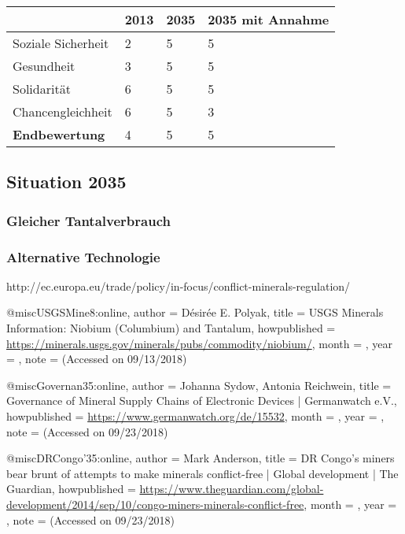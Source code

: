
\begin{table}[]
    \begin{tabular}{l|lll} & \textbf{2013} & \textbf{2035} &  \textbf{2035 mit Annahme} 
        \\ \hline Soziale Sicherheit    & 2  & 5  & 5
        \\ Gesundheit                   & 3  & 5  & 5
        \\ Solidarität                  & 6  & 5  & 5
        \\ Chancengleichheit            & 6  & 5  & 3
        \\ \hline \textbf{Endbewertung} & 4  & 5  & 5
    \end{tabular}
\end{table}




\subsection{Situation 2035}

\subsubsection{Gleicher Tantalverbrauch}

\subsubsection{Alternative Technologie}

http://ec.europa.eu/trade/policy/in-focus/conflict-minerals-regulation/

@misc{USGSMine8:online,
author = {Désirée E. Polyak},
title = {USGS Minerals
Information: Niobium (Columbium) and Tantalum},
howpublished = {\url{https://minerals.usgs.gov/minerals/pubs/commodity/niobium/}},
month = {},
year = {},
note = {(Accessed on 09/13/2018)}
}

@misc{Governan35:online,
author = {Johanna Sydow, Antonia Reichwein},
title = {Governance of Mineral Supply Chains of Electronic Devices | Germanwatch e.V.},
howpublished = {\url{https://www.germanwatch.org/de/15532}},
month = {},
year = {},
note = {(Accessed on 09/23/2018)}
}

@misc{DRCongo’35:online,
author = {Mark Anderson},
title = {DR Congo’s miners bear brunt of attempts to make minerals conflict-free | Global development | The Guardian},
howpublished = {\url{https://www.theguardian.com/global-development/2014/sep/10/congo-miners-minerals-conflict-free}},
month = {},
year = {},
note = {(Accessed on 09/23/2018)}
}

